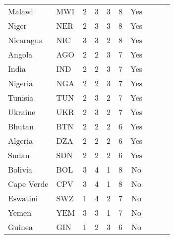 \begin{longtable}{l l c c c c c c c c}
Malawi                     & MWI           & 2          & 3                   & 3         & 8                 & Yes             \\
Niger                      & NER           & 2          & 3                   & 3         & 8                 & Yes             \\
Nicaragua                  & NIC           & 3          & 3                   & 2         & 8                 & Yes             \\
Angola                     & AGO           & 2          & 2                   & 3         & 7                 & Yes             \\
India                      & IND           & 2          & 2                   & 3         & 7                 & Yes             \\
Nigeria                    & NGA           & 2          & 2                   & 3         & 7                 & Yes             \\
Tunisia                    & TUN           & 2          & 3                   & 2         & 7                 & Yes             \\
Ukraine                    & UKR           & 2          & 3                   & 2         & 7                 & Yes             \\
Bhutan                     & BTN           & 2          & 2                   & 2         & 6                 & Yes             \\
Algeria                    & DZA           & 2          & 2                   & 2         & 6                 & Yes             \\
Sudan                      & SDN           & 2          & 2                   & 2         & 6                 & Yes             \\
Bolivia                    & BOL           & 3          & 4                   & 1         & 8                 & No              \\
Cape Verde                 & CPV           & 3          & 4                   & 1         & 8                 & No              \\
Eswatini                   & SWZ           & 1          & 4                   & 2         & 7                 & No              \\
Yemen                      & YEM           & 3          & 3                   & 1         & 7                 & No              \\
Guinea                     & GIN           & 1          & 2                   & 3         & 6                 & No              \\

\end{longtable}

